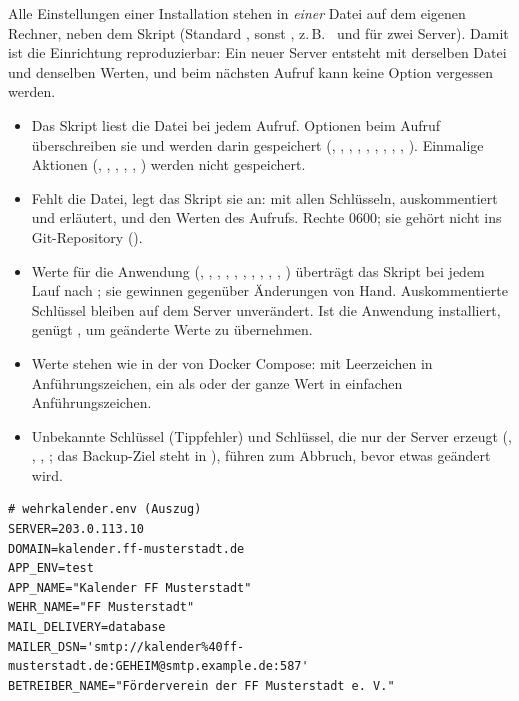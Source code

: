 Alle Einstellungen einer Installation stehen in \emph{einer} Datei auf dem
eigenen Rechner, neben dem Skript (Standard , sonst
, z.\,B.\  und  für zwei
Server). Damit ist die Einrichtung reproduzierbar: Ein neuer Server entsteht
mit derselben Datei und denselben Werten, und beim nächsten Aufruf kann keine
Option vergessen werden.

\begin{itemize}
  \item Das Skript liest die Datei bei jedem Aufruf. Optionen beim Aufruf
        überschreiben sie und werden darin gespeichert (, ,
        , , , , , ,
        , ). Einmalige Aktionen (, ,
        , , , ) werden nicht gespeichert.
  \item Fehlt die Datei, legt das Skript sie an: mit allen Schlüsseln,
        auskommentiert und erläutert, und den Werten des Aufrufs. Rechte
        0600; sie gehört nicht ins Git-Repository ().
  \item Werte für die Anwendung (, ,
        , , ,
        , , ,
        , , ) überträgt
        das Skript bei jedem Lauf nach ; sie
        gewinnen gegenüber Änderungen von Hand. Auskommentierte Schlüssel
        bleiben auf dem Server unverändert. Ist die Anwendung installiert,
        genügt , um geänderte Werte zu übernehmen.
  \item Werte stehen wie in der  von Docker Compose: mit
        Leerzeichen in Anführungszeichen, ein \code{\$} als \code{\$\$} oder
        der ganze Wert in einfachen Anführungszeichen.
  \item Unbekannte Schlüssel (Tippfehler) und Schlüssel, die nur der Server
        erzeugt (, , ,
        ; das Backup-Ziel steht in
        ), führen zum Abbruch, bevor etwas geändert wird.
\end{itemize}

\begin{lstlisting}
# wehrkalender.env (Auszug)
SERVER=203.0.113.10
DOMAIN=kalender.ff-musterstadt.de
APP_ENV=test
APP_NAME="Kalender FF Musterstadt"
WEHR_NAME="FF Musterstadt"
MAIL_DELIVERY=database
MAILER_DSN='smtp://kalender%40ff-musterstadt.de:GEHEIM@smtp.example.de:587'
BETREIBER_NAME="Förderverein der FF Musterstadt e. V."
\end{lstlisting}

